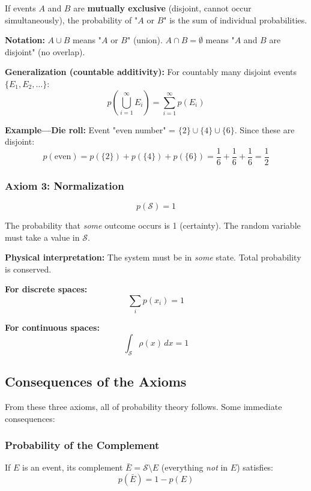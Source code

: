 \documentclass[9pt,twocoloumn]{article}
\begin{document}
If events $A$ and $B$ are \textbf{mutually exclusive} (disjoint, cannot occur simultaneously), the probability of "$A$ or $B$" is the sum of individual probabilities.

\textbf{Notation:} $A \cup B$ means "$A$ or $B$" (union). $A \cap B = \emptyset$ means "$A$ and $B$ are disjoint" (no overlap).

\textbf{Generalization (countable additivity):} For countably many disjoint events $\{E_1, E_2, \ldots\}$:
\begin{equation}
p\left( \bigcup_{i=1}^\infty E_i \right) = \sum_{i=1}^\infty p(E_i)
\end{equation}

\textbf{Example—Die roll:} Event "even number" = $\{2\} \cup \{4\} \cup \{6\}$. Since these are disjoint:
\begin{equation}
p(\text{even}) = p(\{2\}) + p(\{4\}) + p(\{6\}) = \frac{1}{6} + \frac{1}{6} + \frac{1}{6} = \frac{1}{2}
\end{equation}

\subsubsection{Axiom 3: Normalization}
\begin{equation}
\boxed{p(\mathcal{S}) = 1}
\end{equation}

The probability that \emph{some} outcome occurs is 1 (certainty). The random variable must take a value in $\mathcal{S}$.

\textbf{Physical interpretation:} The system must be in \emph{some} state. Total probability is conserved.

\textbf{For discrete spaces:}
\begin{equation}
\sum_{i} p(x_i) = 1
\end{equation}

\textbf{For continuous spaces:}
\begin{equation}
\int_{\mathcal{S}} \rho(x) \, dx = 1
\end{equation}

\subsection{Consequences of the Axioms}

From these three axioms, all of probability theory follows. Some immediate consequences:

\subsubsection{Probability of the Complement}
If $E$ is an event, its complement $\bar{E} = \mathcal{S} \setminus E$ (everything \emph{not} in $E$) satisfies:
\begin{equation}
p(\bar{E}) = 1 - p(E)
\end{equation}
\end{document}
